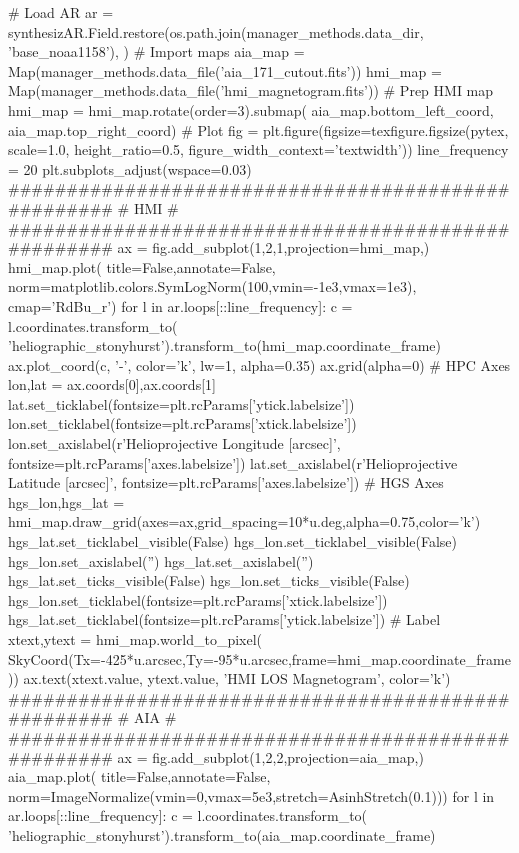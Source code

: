 \begin{pycode}
# Load AR
ar = synthesizAR.Field.restore(os.path.join(manager_methods.data_dir, 'base_noaa1158'), )
# Import maps
aia_map = Map(manager_methods.data_file('aia_171_cutout.fits'))
hmi_map = Map(manager_methods.data_file('hmi_magnetogram.fits'))
# Prep HMI map
hmi_map = hmi_map.rotate(order=3).submap(
    aia_map.bottom_left_coord, aia_map.top_right_coord)
# Plot
fig = plt.figure(figsize=texfigure.figsize(pytex, scale=1.0, height_ratio=0.5,       
                                           figure_width_context='textwidth'))
line_frequency = 20
plt.subplots_adjust(wspace=0.03)
####################################################
#                       HMI                        #
####################################################
ax = fig.add_subplot(1,2,1,projection=hmi_map,)
hmi_map.plot(
    title=False,annotate=False,
    norm=matplotlib.colors.SymLogNorm(100,vmin=-1e3,vmax=1e3),
    cmap='RdBu_r')
for l in ar.loops[::line_frequency]:
    c = l.coordinates.transform_to(
            'heliographic_stonyhurst').transform_to(hmi_map.coordinate_frame)
    ax.plot_coord(c, '-', color='k', lw=1, alpha=0.35)
ax.grid(alpha=0)
# HPC Axes
lon,lat = ax.coords[0],ax.coords[1]
lat.set_ticklabel(fontsize=plt.rcParams['ytick.labelsize'])
lon.set_ticklabel(fontsize=plt.rcParams['xtick.labelsize'])
lon.set_axislabel(r'Helioprojective Longitude [arcsec]', fontsize=plt.rcParams['axes.labelsize'])
lat.set_axislabel(r'Helioprojective Latitude [arcsec]', fontsize=plt.rcParams['axes.labelsize'])
# HGS Axes
hgs_lon,hgs_lat = hmi_map.draw_grid(axes=ax,grid_spacing=10*u.deg,alpha=0.75,color='k')
hgs_lat.set_ticklabel_visible(False)
hgs_lon.set_ticklabel_visible(False)
hgs_lon.set_axislabel('')
hgs_lat.set_axislabel('')
hgs_lat.set_ticks_visible(False)
hgs_lon.set_ticks_visible(False)
hgs_lon.set_ticklabel(fontsize=plt.rcParams['xtick.labelsize'])
hgs_lat.set_ticklabel(fontsize=plt.rcParams['ytick.labelsize'])
# Label
xtext,ytext = hmi_map.world_to_pixel(
    SkyCoord(Tx=-425*u.arcsec,Ty=-95*u.arcsec,frame=hmi_map.coordinate_frame))
ax.text(xtext.value, ytext.value, 'HMI LOS Magnetogram', color='k')
####################################################
#                       AIA                        #
####################################################
ax = fig.add_subplot(1,2,2,projection=aia_map,)
aia_map.plot(
    title=False,annotate=False,
    norm=ImageNormalize(vmin=0,vmax=5e3,stretch=AsinhStretch(0.1)))
for l in ar.loops[::line_frequency]:
    c = l.coordinates.transform_to(
            'heliographic_stonyhurst').transform_to(aia_map.coordinate_frame)

\end{pycode}
